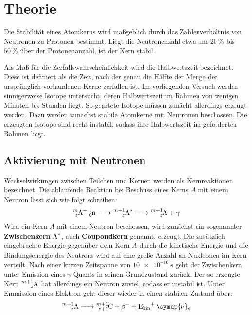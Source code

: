 \section{Theorie}
\label{sec:Theorie}
Die Stabilität eines Atomkerns wird maßgeblich durch das Zahlenverhältnis von Neutronen zu Protonen bestimmt. Liegt die Neutronenzahl etwa um $\SI{20}{\percent}$ bis $\SI{50}{\percent}$ über der Protonenanzahl, ist der Kern stabil.

Als Maß für die Zerfallswahrscheinlichkeit wird die Halbwertszeit bezeichnet. Diese ist definiert als die Zeit, nach der genau die Hälfte der Menge der ursprünglich vorhandenen Kerne zerfallen ist.
Im vorliegenden Versuch werden sinnigerweise Isotope untersucht, deren Halbwertszeit im Rahmen von wenigen Minuten bis Stunden liegt.
So geartete Isotope müssen zunächt allerdings erzeugt werden. Dazu werden zunächst stabile Atomkerne mit Neutronen beschossen. Die erzeugten Isotope sind recht instabil, sodass ihre Halbwertszeit im geforderten Rahmen liegt.


\subsection{Aktivierung mit Neutronen}
Wechselwirkungen zwischen Teilchen und Kernen werden als Kernreaktionen bezeichnet.
Die ablaufende Reaktion bei Beschuss eines Kerns $A$ mit einem Neutron lässt sich wie folgt schreiben:
\begin{align}
  \ce{^{m}_{z}A+ ^{1}_0n -> ^{m+1}_zA^{*} -> ^{m+1}_zA +\gamma}
\end{align}
Wird ein Kern $A$ mit einem Neutron beschossen, wird zunächst ein sogenannter \textbf{Zwischenkern} $\ce{A^{*}}$, auch \textbf{Coupondkern} genannt, erzeugt. Die zusätzlich eingebrachte Energie gegenüber dem Kern $A$ durch die kinetische Energie und die Bindungsenergie des Neutrons wird auf eine große Anzahl an Nukleonen im Kern verteilt.
Nach einer kurzen Zeitspanne von $\SI{10e-16}{\second}$ geht der Zwischenkern unter Emission eines $\gamma$-Quants in seinen Grundzustand zurück.
Der so erzeugte Kern $\ce{^{m+1}_zA }$ hat allerdings ein Neutron zuviel, sodass er instabil ist.
Unter Emmission eines Elektron geht dieser wieder in einen stabilen Zustand über:
\begin{align*}
\ce{^{m+1}_zA -> ^{m+1}_{z+1}C +\beta ^{-} + E_{\mathrm{kin }}+ \bar{\symup{\nu}}_e}
\end{align*}

